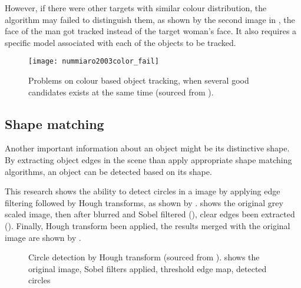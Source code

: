 However, if there were other targets with similar colour distribution, the algorithm may failed to distinguish them, as shown by the second image in , the face of the man got tracked instead of the target woman's face. It also requires a specific model associated with each of the objects to be tracked.

\begin{figure}[H]
  \centering
  \texttt{[image: nummiaro2003color\_fail]}
  \caption{Problems on colour based object tracking, when several good candidates exists at the same time (sourced from \cite{nummiaro2003color}).}
  \label{Figure:nummiaro2003color_fail}
\end{figure}

\subsection{Shape matching}

Another important information about an object might be its distinctive shape. By extracting object edges in the scene than apply appropriate shape matching algorithms, an object can be detected based on its shape.

This research \cite{borovicka2003circle} shows the ability to detect circles in a image by applying edge filtering followed by Hough transforms, as shown by .  shows the original grey scaled image, then after blurred and Sobel filtered (), clear edges been extracted (). Finally, Hough transform been applied, the results merged with the original image are shown by .

\begin{figure}[H]
  \centering
  \caption{Circle detection by Hough transform (sourced from \cite{borovicka2003circle}).  shows the original image,  Sobel filters applied,  threshold edge map,  detected circles}
  \label{Figure:bg_circles}
\end{figure}

